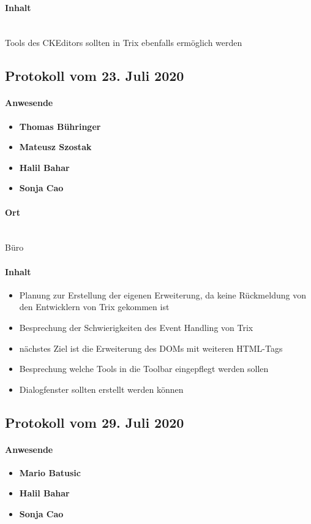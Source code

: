 \paragraph{Inhalt}\mbox{}\\
Tools des CKEditors sollten in Trix ebenfalls ermöglich werden

\subsection{Protokoll vom 23. Juli 2020}
\paragraph{Anwesende}
\begin{itemize}
	\item{\textbf{Thomas Bühringer}}
	\item{\textbf{Mateusz Szostak}}
	\item{\textbf{Halil Bahar}}
	\item{\textbf{Sonja Cao}}
\end{itemize}

\paragraph{Ort}\mbox{}\\
Büro

\paragraph{Inhalt}
\begin{itemize}
	\item Planung zur Erstellung der eigenen Erweiterung, da keine Rückmeldung von den Entwicklern von Trix gekommen ist
	\item Besprechung der Schwierigkeiten des Event Handling von Trix
	\item nächstes Ziel ist die Erweiterung des DOMs mit weiteren HTML-Tags
	\item Besprechung welche Tools in die Toolbar eingepflegt werden sollen
	\item Dialogfenster sollten erstellt werden können
\end{itemize}

\subsection{Protokoll vom 29. Juli 2020}
\paragraph{Anwesende}
\begin{itemize}
	\item{\textbf{Mario Batusic}}
	\item{\textbf{Halil Bahar}}
	\item{\textbf{Sonja Cao}}
\end{itemize}

